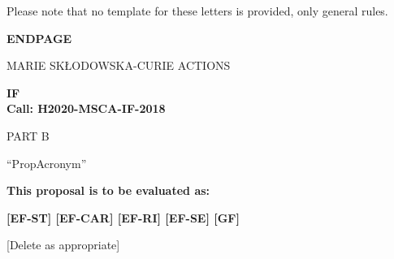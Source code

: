 \noindent
Please note that no template for these letters is provided, only general rules.





\newpage
\label{sec:endpage}
\vspace{15mm}
\begin{center}


        \Large{
      
     
        \textbf{ENDPAGE}
  
          \vspace{15mm}
          MARIE SK\L{}ODOWSKA-CURIE ACTIONS\\
          \vspace{1cm}
          
          \textbf{\acf{IF}}\\
          \textbf{Call: H2020-MSCA-IF-2018}
          \vspace{2cm}                   

          PART B
          \vspace{2.5cm}

          ``{\sc \ac{PropAcronym}\xspace}''
          \vspace{2cm}

          \textbf{This proposal is to be evaluated as:}
          \vspace{.5cm}

          \textbf{[EF-ST] [EF-CAR] [EF-RI] [EF-SE] [GF]}\\
        }
        \large{[Delete as appropriate]}

  \end{center}
\vspace{1cm}
